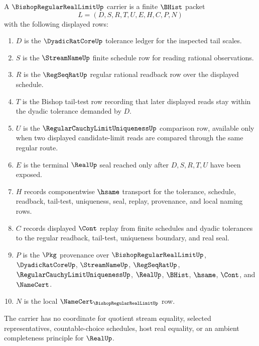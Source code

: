 \begin{definition}
\label{def:bishop-regular-real-limit-carrier}
A $\BishopRegularRealLimitUp$ carrier is a finite $\BHist$ packet
$$
L=(D,S,R,T,U,E,H,C,P,N)
$$
with the following displayed rows:
\begin{enumerate}
\item $D$ is the $\DyadicRatCoreUp$ tolerance ledger for the inspected tail scales.
\item $S$ is the $\StreamNameUp$ finite schedule row for reading rational observations.
\item $R$ is the $\RegSeqRatUp$ regular rational readback row over the displayed schedule.
\item $T$ is the Bishop tail-test row recording that later displayed reads stay within the dyadic tolerance demanded by $D$.
\item $U$ is the $\RegularCauchyLimitUniquenessUp$ comparison row, available only when two displayed candidate-limit reads are compared through the same regular route.
\item $E$ is the terminal $\RealUp$ seal reached only after $D,S,R,T,U$ have been exposed.
\item $H$ records componentwise $\hsame$ transport for the tolerance, schedule, readback, tail-test, uniqueness, seal, replay, provenance, and local naming rows.
\item $C$ records displayed $\Cont$ replay from finite schedules and dyadic tolerances to the regular readback, tail-test, uniqueness boundary, and real seal.
\item $P$ is the $\Pkg$ provenance over $\BishopRegularRealLimitUp$, $\DyadicRatCoreUp$, $\StreamNameUp$, $\RegSeqRatUp$, $\RegularCauchyLimitUniquenessUp$, $\RealUp$, $\BHist$, $\hsame$, $\Cont$, and $\NameCert$.
\item $N$ is the local $\NameCert_{\BishopRegularRealLimitUp}$ row.
\end{enumerate}
The carrier has no coordinate for quotient stream equality, selected representatives, countable-choice schedules, host real equality, or an ambient completeness principle for $\RealUp$.
\end{definition}

